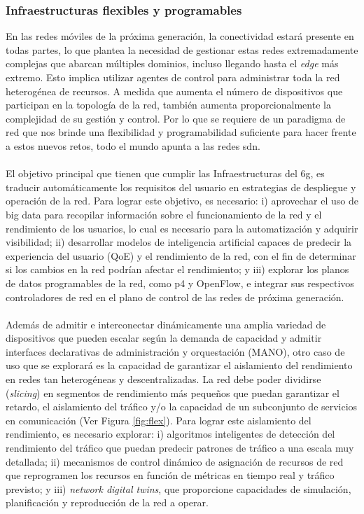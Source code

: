 \subsubsection{Infraestructuras flexibles y programables }

En las redes móviles de la próxima generación, la conectividad estará presente en todas partes, lo que plantea la necesidad de gestionar estas redes extremadamente complejas que abarcan múltiples dominios, incluso llegando hasta el \textit{edge} más extremo. Esto implica utilizar agentes de control para administrar toda la red heterogénea de recursos. A medida que aumenta el número de dispositivos que participan en la topología de la red, también aumenta proporcionalmente la complejidad de su gestión y control. Por lo que se requiere de un paradigma de red que nos brinde una flexibilidad y programabilidad suficiente para hacer frente a estos nuevos retos, todo el mundo apunta a las redes \gls{sdn}. \\
\\
El objetivo principal que tienen que cumplir las Infraestructuras del \gls{6g}, es traducir automáticamente los requisitos del usuario en estrategias de despliegue y operación de la red. Para lograr este objetivo, es necesario: i) aprovechar el uso de big data para recopilar información sobre el funcionamiento de la red y el rendimiento de los usuarios, lo cual es necesario para la automatización y adquirir visibilidad; ii) desarrollar modelos de inteligencia artificial capaces de predecir la experiencia del usuario (QoE) y el rendimiento de la red, con el fin de determinar si los cambios en la red podrían afectar el rendimiento; y iii) explorar los planos de datos programables de la red, como \gls{p4} y OpenFlow, e integrar sus respectivos controladores de red en el plano de control de las redes de próxima generación.\\
\\
Además de admitir e interconectar dinámicamente una amplia variedad de dispositivos que pueden escalar según la demanda de capacidad y admitir interfaces declarativas de administración y orquestación (MANO), otro caso de uso que se explorará es la capacidad de garantizar el aislamiento del rendimiento en redes tan heterogéneas y descentralizadas. La red debe poder dividirse (\textit{slicing})  en segmentos de rendimiento más pequeños que puedan garantizar el retardo, el aislamiento del tráfico y/o la capacidad de un subconjunto de servicios en comunicación (Ver Figura \ref{fig:flex}). Para lograr este aislamiento del rendimiento, es necesario explorar: i) algoritmos inteligentes de detección del rendimiento del tráfico que puedan predecir patrones de tráfico a una escala muy detallada; ii) mecanismos de control dinámico de asignación de recursos de red que reprogramen los recursos en función de métricas en tiempo real y tráfico previsto; y iii) \textit{network digital twins}, que proporcione capacidades de simulación, planificación y reproducción de la red a operar.\\

